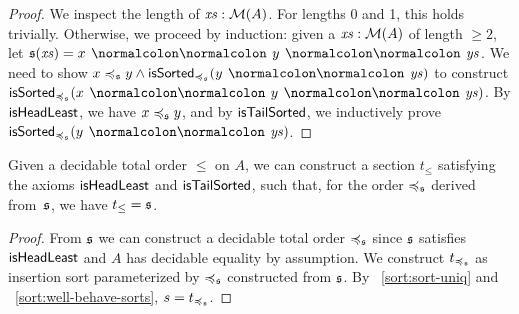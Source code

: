 \begin{proof}
    We inspect the length of $\mathit{xs} : \mathcal{M}(A)$.
    For lengths 0 and 1, this holds trivially.
    Otherwise, we proceed by induction:
    given a $\mathit{xs} : \mathcal{M}(A)$ of length $\geq 2$, let $\ssection(\xs) = x \cons y \cons \ys$.
    We need to show
    $x \leqs y \land \isSorted_{\leqs}(y \cons \ys)$ to construct
    $\isSorted_{\leqs}(x \cons y \cons \ys)$.
    By $\operatorname{\mathsf{isHeadLeast}}$, we have $x \preccurlyeq_{\mathfrak{s}} y$, and by $\operatorname{\mathsf{isTailSorted}}$, we
    inductively prove $\isSorted_{\leqs}(y \cons \ys)$.
\end{proof}

\begin{lemma}
    \label{sort:s2o2s}
    Given a decidable total order $\leq$ on $A$, we can construct
    a section $t_\leq$ satisfying the axioms $\operatorname{\mathsf{isHeadLeast}}$ and $\operatorname{\mathsf{isTailSorted}}$,
    such that, for the order $\preccurlyeq_{\mathfrak{s}}$ derived from~$\mathfrak{s}$,
    we have $t_{\leq} = \mathfrak{s}$.
\end{lemma}
\begin{proof}
    From $\mathfrak{s}$ we can construct a decidable total order $\preccurlyeq_{\mathfrak{s}}$ since $\mathfrak{s}$ satisfies
    $\operatorname{\mathsf{isHeadLeast}}$ and $A$ has decidable equality by assumption.
    We construct $t_{\preccurlyeq_{\mathfrak{s}}}$ as insertion sort
    parameterized by $\preccurlyeq_{\mathfrak{s}}$ constructed from $\mathfrak{s}$.
    By ~\cref{sort:sort-uniq} and ~\cref{sort:well-behave-sorts}, $s = t_{\preccurlyeq_{\mathfrak{s}}}$.
\end{proof}

